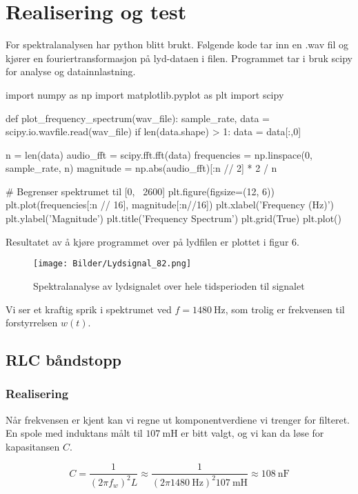 \section{Realisering og test}
\label{realiseringOgTest}
For spektralanalysen har python blitt brukt. Følgende kode tar inn en .wav fil og kjører en fouriertransformasjon på lyd-dataen i filen. Programmet tar i bruk 
scipy for analyse og datainnlastning.

\begin{pythoncode}
import numpy as np
import matplotlib.pyplot as plt
import scipy

def plot_frequency_spectrum(wav_file):
    sample_rate, data = scipy.io.wavfile.read(wav_file)
    if len(data.shape) > 1:
        data = data[:,0]

    n = len(data)
    audio_fft = scipy.fft.fft(data)
    frequencies = np.linspace(0, sample_rate, n)
    magnitude = np.abs(audio_fft)[:n // 2] * 2 / n

    # Begrenser spektrumet til [0, ~2600]
    plt.figure(figsize=(12, 6))
    plt.plot(frequencies[:n // 16], magnitude[:n//16]) 
    plt.xlabel('Frequency (Hz)')
    plt.ylabel('Magnitude')
    plt.title('Frequency Spectrum')
    plt.grid(True)
    plt.plot()
\end{pythoncode}

Resultatet av å kjøre programmet over på lydfilen er plottet i figur 6.

\begin{figure}[H]
    \centering
    \texttt{[image: Bilder/Lydsignal\_82.png]}
    \caption{Spektralanalyse av lydsignalet over hele tidsperioden til signalet}
\end{figure}

Vi ser et kraftig sprik i spektrumet ved $f = \SI{1480}{\hertz}$, som trolig er frekvensen til forstyrrelsen $w(t)$.

\subsection{RLC båndstopp}
\subsubsection{Realisering}
Når frekvensen er kjent kan vi regne ut komponentverdiene vi trenger for filteret. En spole med induktans målt til $\SI{107}{\milli\henry}$ er bitt valgt,
og vi kan da løse for kapasitansen $C$.

\[
    C = \frac{1}{(2\pi f_w)^2 L} \approx \frac{1}{(2\pi \SI{1480}{\hertz})^2 \SI{107}{\milli\henry}} \approx \SI{108}{\nano\farad}
\]


